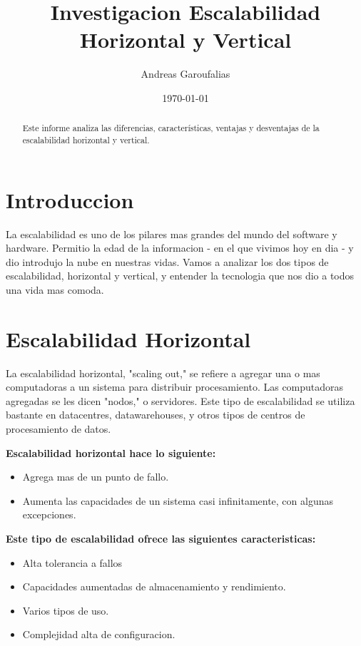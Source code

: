 \documentclass[11pt]{article}
\title{Investigacion Escalabilidad Horizontal y Vertical}
\author{Andreas Garoufalias}
\date{\today}
\begin{document}
\maketitle

\begin{abstract}
Este informe analiza las diferencias, características, ventajas y desventajas de la escalabilidad horizontal y vertical.
\end{abstract}

\section{Introduccion}

La escalabilidad es uno de los pilares mas grandes del mundo del software y hardware. Permitio la edad de la informacion - en el que vivimos hoy en dia - y dio introdujo la nube en nuestras vidas. Vamos a analizar los dos tipos de escalabilidad, horizontal y vertical, y entender la tecnologia que nos dio a todos una vida mas comoda.

\section{Escalabilidad Horizontal}

La escalabilidad horizontal, "scaling out," se refiere a agregar una o mas computadoras a un sistema para distribuir procesamiento. Las computadoras agregadas se les dicen "nodos," o servidores. Este tipo de escalabilidad se utiliza bastante en datacentres, datawarehouses, y otros tipos de centros de procesamiento de datos.
\newline

\textbf{Escalabilidad horizontal hace lo siguiente:}
\begin{itemize}
\item Agrega mas de un punto de fallo.
\item Aumenta las capacidades de un sistema casi infinitamente, con algunas excepciones.
\end{itemize}

\textbf{Este tipo de escalabilidad ofrece las siguientes caracteristicas:}
\begin{itemize}
\item Alta tolerancia a fallos
\item Capacidades aumentadas de almacenamiento y rendimiento.
\item Varios tipos de uso.
\item Complejidad alta de configuracion.
\end{itemize}
\end{document}
